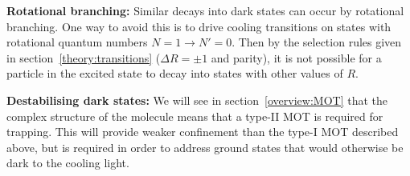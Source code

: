 \textbf{Rotational branching:} Similar decays into dark states can occur by
rotational branching. One way to avoid this is to drive cooling transitions on
states with rotational quantum numbers $N=1 \rightarrow N'=0$. Then by the
selection rules given in section~\ref{theory:transitions} ($\Delta R =  \pm1$
and parity), it is not possible for a particle in the excited state to decay
into states with other values of $R$.

\textbf{Destabilising dark states:} We will see in section~\ref{overview:MOT}
that the complex structure of the molecule means that a type-II MOT is required
for trapping. This will provide weaker confinement than the type-I MOT
described above, but is required in order to address ground states that would
otherwise be dark to the cooling light.
